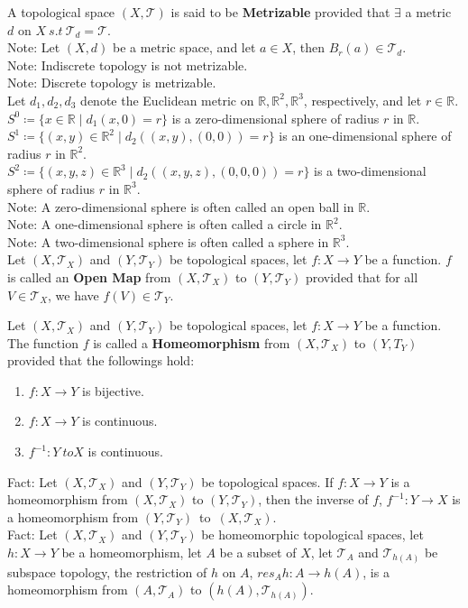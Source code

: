 \documentclass[11pt]{article}
\newcommand{\R}{\mathbb{R}}
\newcommand{\T}{\mathcal{T}}
\newcommand{\note}{\color{gray}Note: \color{black}}
\newcommand{\fact}{\color{gray}Fact: \color{black}}
\begin{document}
		\noindent A topological space $(X,\T)$ is said to be \textbf{Metrizable} provided that $\exists$ a metric $d$ on $X \ s.t \ \T_d = \T$.\\
		\note Let $(X,d)$ be a metric space, and let $a \in X$, then $B_r(a) \in \T_d$.\\
		\note Indiscrete topology is not metrizable.\\
		\note Discrete topology is metrizable.\\

		
		\noindent Let $d_1,d_2,d_3$ denote the Euclidean metric on $\R,\R^2,\R^3$, respectively, and let $r \in \R$.\\ $S^0 \coloneqq \{ x \in \R \mid d_1(x,0)=r \}$ is a zero-dimensional sphere of radius $r$ in $\R$.\\ $S^1 \coloneqq \{ (x,y) \in \R^2 \mid d_2((x,y),(0,0))=r \}$ is an one-dimensional sphere of radius $r$ in $\R^2$.\\ $S^2 \coloneqq \{ (x,y,z) \in \R^3 \mid d_2((x,y,z),(0,0,0))=r \}$ is a two-dimensional sphere of radius $r$ in $\R^3$.\\
		\note A zero-dimensional sphere is often called an open ball in $\R$.\\
		\note A one-dimensional sphere is often called a circle in $\R^2$.\\
		\note A two-dimensional sphere is often called a sphere in $\R^3$.\\
		
		\noindent Let $(X,\T_X)$ and $(Y,\T_Y)$ be topological spaces, let $f:X \to Y$ be a function. $f$ is called an \textbf{Open Map} from $(X,\T_X)$ to $(Y,\T_Y)$ provided that for all $V \in \T_X$, we have $f(V) \in \T_Y$.\\
\clearpage

		\noindent Let $(X,\T_X)$ and $(Y,\T_Y)$ be topological spaces, let $f:X \to Y$ be a function. The function $f$ is called a \textbf{Homeomorphism} from $(X,\T_X)$ to $(Y,T_Y)$ provided that the followings hold:
		\begin{enumerate}[topsep=3pt,itemsep=-1ex,partopsep=1ex,parsep=1ex]
			\item $f:X \to Y$ is bijective.
			\item $f:X \to Y$ is continuous.
			\item $f^{-1}:Y \ to X$ is continuous.
		\end{enumerate}
		\fact Let $(X,\T_X)$ and $(Y,\T_Y)$ be topological spaces. If $f:X \to Y$ is a homeomorphism from $(X,\T_X)$ to $(Y,\T_Y)$, then the inverse of $f$, $f^{-1}:Y \to X$ is a homeomorphism from \mbox{$(Y,\T_Y)$ to $(X,\T_X)$}.\\
		\fact Let $(X,\T_X)$ and $(Y,\T_Y)$ be homeomorphic topological spaces, let $h:X \to Y$ be a homeomorphism, let $A$ be a subset of $X$, let $\T_A$ and $\T_{h(A)}$ be subspace topology, the restriction of $h$ on $A$, $res_A h:A \to h(A)$, is a homeomorphism from $(A,\T_A)$ to $(h(A), \T_{h(A)})$.\\
		
\end{document}
